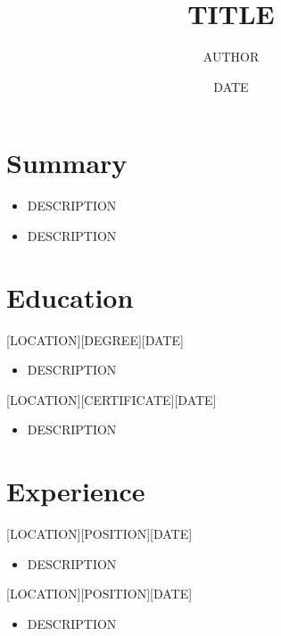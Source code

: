 \documentclass{article}
\title{TITLE}
\author{AUTHOR}
\date{DATE}
\begin{document}

\makecvtitle %

\section{Summary}

\begin{itemize}
    \item DESCRIPTION
\end{itemize}

\begin{itemize}
    \item DESCRIPTION
\end{itemize}

\section{Education}

[LOCATION][DEGREE][DATE]

\begin{itemize}
    \item DESCRIPTION
\end{itemize}

[LOCATION][CERTIFICATE][DATE]

\begin{itemize}
    \item DESCRIPTION
\end{itemize}

\section{Experience}

[LOCATION][POSITION][DATE]

\begin{itemize}
    \item DESCRIPTION
\end{itemize}

[LOCATION][POSITION][DATE]

\begin{itemize}
    \item DESCRIPTION
\end{itemize}
\end{document}
